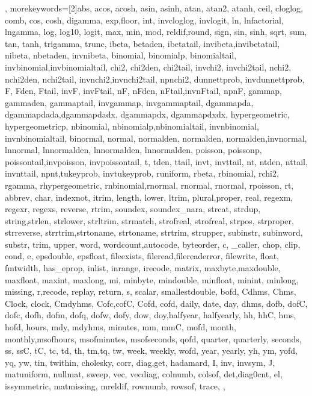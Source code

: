 {{	},
	morekeywords=[2]{abs, acos, acosh, asin, asinh, atan, atan2, atanh, ceil, cloglog, comb, cos, cosh, digamma, exp,floor, int, invcloglog, invlogit, ln, lnfactorial, lngamma, log, log10, logit, max, min, mod, reldif,round, sign, sin, sinh, sqrt, sum, tan, tanh, trigamma, trunc, ibeta, betaden, ibetatail, invibeta,invibetatail, nibeta, nbetaden, invnibeta, binomial, binomialp, binomialtail, invbinomial,invbinomialtail, chi2, chi2den, chi2tail, invchi2, invchi2tail, nchi2, nchi2den, nchi2tail, invnchi2,invnchi2tail, npnchi2, dunnettprob, invdunnettprob, F, Fden, Ftail, invF, invFtail, nF, nFden, nFtail,invnFtail, npnF, gammap, gammaden, gammaptail, invgammap, invgammaptail, dgammapda, dgammapdada,dgammapdadx, dgammapdx, dgammapdxdx, hypergeometric, hypergeometricp, nbinomial, nbinomialp,nbinomialtail, invnbinomial, invnbinomialtail, binormal, normal, normalden, normalden, normalden,invnormal, lnnormal, lnnormalden, lnnormalden, lnnormalden, poisson, poissonp, poissontail,invpoisson, invpoissontail, t, tden, ttail, invt, invttail, nt, ntden, nttail, invnttail, npnt,tukeyprob, invtukeyprob, runiform, rbeta, rbinomial, rchi2, rgamma, rhypergeometric, rnbinomial,rnormal, rnormal, rnormal, rpoisson, rt, abbrev, char, indexnot, itrim, length, lower, ltrim, plural,proper, real, regexm, regexr, regexs, reverse, rtrim, soundex, soundex_nara, strcat, strdup, string,strlen, strlower, strltrim, strmatch, strofreal, strofreal, strpos, strproper, strreverse, strrtrim,strtoname, strtoname, strtrim, strupper, subinstr, subinword, substr, trim, upper, word, wordcount,autocode, byteorder, c, _caller, chop, clip, cond, e, epsdouble, epsfloat, fileexists, fileread,filereaderror, filewrite, float, fmtwidth, has_eprop, inlist, inrange, irecode, matrix, maxbyte,maxdouble, maxfloat, maxint, maxlong, mi, minbyte, mindouble, minfloat, minint, minlong, missing, r,recode, replay, return, s, scalar, smallestdouble, bofd, Cdhms, Chms, Clock, clock, Cmdyhms, Cofc,cofC, Cofd, cofd, daily, date, day, dhms, dofb, dofC, dofc, dofh, dofm, dofq, dofw, dofy, dow, doy,halfyear, halfyearly, hh, hhC, hms, hofd, hours, mdy, mdyhms, minutes, mm, mmC, mofd, month, monthly,msofhours, msofminutes, msofseconds, qofd, quarter, quarterly, seconds, ss, ssC, tC, tc, td, th, tm,tq, tw, week, weekly, wofd, year, yearly, yh, ym, yofd, yq, yw, tin, twithin, cholesky, corr, diag,get, hadamard, I, inv, invsym, J, matuniform, nullmat, sweep, vec, vecdiag, colnumb, colsof, det,diag0cnt, el, issymmetric, matmissing, mreldif, rownumb, rowsof, trace,
	},
}





